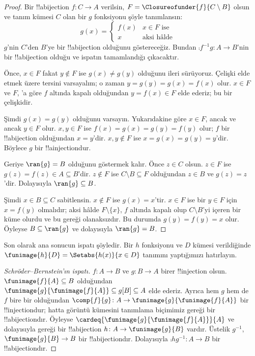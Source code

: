 \documentclass[../../../include/open-logic-section]{subfiles}
\begin{document}
\begin{proof}
Bir !!a{bijection} $f\colon C\to A$ verilsin,
$F=\Closureofunder{f}{C\setminus B}$ olsun ve tanım kümesi $C$ olan bir $g$
fonksiyonu şöyle tanımlansın:
\[
	g(x) =
	\begin{cases}
			f(x) &\text{$x \in F$ ise}\\
			x & \text{aksi hâlde}
		\end{cases}
\]
$g$'nin $C$'den $B$'ye bir !!a{bijection} olduğunu göstereceğiz. Bundan
$\comp{f^{-1}}{g}\colon A\to B$'nin bir !!a{bijection} olduğu ve ispatın
tamamlandığı çıkacaktır.

Önce, $x\in F$ fakat $y\notin F$ ise $g(x)\neq g(y)$ olduğunu ileri sürüyoruz.
Çelişki elde etmek üzere tersini varsayalım; o zaman
$y=g(y)=g(x)=f(x)$ olur. $x\in F$ ve $F$,
'a göre $f$ altında kapalı olduğundan
$y=f(x)\in F$ elde ederiz; bu bir çelişkidir.

Şimdi $g(x)=g(y)$ olduğunu varsayın. Yukarıdakine göre $x\in F$, ancak ve
ancak $y\in F$ olur. $x,y\in F$ ise $f(x)=g(x)=g(y)=f(y)$ olur; $f$ bir
!!a{bijection} olduğundan $x=y$'dir. $x,y\notin F$ ise
$x=g(x)=g(y)=y$'dir. Böylece $g$ bir !!a{injection}dur.

Geriye $\ran{g}=B$ olduğunu göstermek kalır. Önce $z\in C$ olsun.
$z\in F$ ise $g(z)=f(z)\in A\subseteq B$'dir. $z\notin F$ ise
$C\setminus B\subseteq F$ olduğundan $z\in B$ ve $g(z)=z$'dir. Dolayısıyla
$\ran{g}\subseteq B$.

Şimdi $x\in B\subseteq C$ sabitlensin. $x\notin F$ ise $g(x)=x$'tir.
$x\in F$ ise bir $y\in F$ için $x=f(y)$ olmalıdır; aksi hâlde
$F\setminus\{x\}$, $f$ altında kapalı olup $C\setminus B$'yi içeren bir
küme olurdu ve bu  gereği olanaksızdır. Bu durumda
$g(y)=f(y)=x$ olur. Öyleyse $B\subseteq\ran{g}$ ve dolayısıyla
$\ran{g}=B$.
\end{proof}

Son olarak ana sonucun ispatı şöyledir. Bir $h$ fonksiyonu ve $D$ kümesi
verildiğinde $\funimage{h}{D}=\Setabs{h(x)}{x\in D}$ tanımını yaptığımızı
hatırlayın.

\begin{proof}[Schr\"oder--Bernstein'ın ispatı] $f\colon A\to B$ ve
$g\colon B\to A$ birer !!{injection} olsun. $\funimage{f}{A}\subseteq B$
olduğundan
$\funimage{g}{\funimage{f}{A}}\subseteq g[B]\subseteq A$ elde ederiz.
Ayrıca hem $g$ hem de $f$ bire bir olduğundan
$\comp{f}{g}\colon A\to\funimage{g}{\funimage{f}{A}}$ bir
!!{injection}dur; hatta görüntü kümesini tanımlama biçimimiz gereği bir
!!a{bijection}dır. Öyleyse
$\cardeq{\funimage{g}{\funimage{f}{A}}}{A}$ ve dolayısıyla
 gereği bir !!a{bijection}
$h\colon A\to\funimage{g}{B}$ vardır. Üstelik $g^{-1}$,
$\funimage{g}{B}\to B$ bir !!a{bijection}dır. Dolayısıyla
$\comp{h}{g^{-1}}\colon A\to B$ bir !!a{bijection}dır.
\end{proof}
\end{document}
